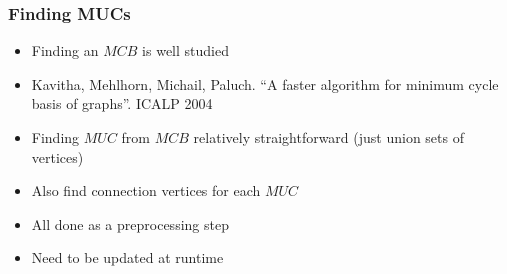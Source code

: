 \begin{frame}
  \frametitle{Finding MUCs}
  
  \begin{itemize}
    \item Finding an $MCB$ is well studied
    \item Kavitha, Mehlhorn, Michail, Paluch. ``A faster algorithm for minimum cycle basis of graphs''. ICALP 2004
    \item Finding $MUC$ from $MCB$ relatively straightforward (just union sets of vertices)
    \item Also find connection vertices for each $MUC$
    \item All done as a preprocessing step
    \item Need to be updated at runtime
  \end{itemize}
\end{frame}


